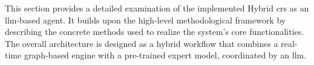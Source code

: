 This section provides a detailed examination of the implemented Hybrid \acl{crs} as an \ac{llm}-based agent. It builds upon the high-level methodological framework by describing the concrete methods used to realize the system's core functionalities. The overall architecture is designed as a hybrid workflow that combines a real-time graph-based engine with a pre-trained expert model, coordinated by an \ac{llm}.